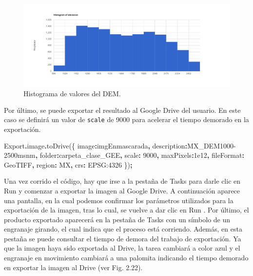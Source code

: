 \documentclass[
  12pt,
  letterpaper,
  twoside]{book}
\newenvironment{Shaded}{\begin{snugshade}}{\end{snugshade}}
\newcommand{\AttributeTok}[1]{\textcolor[rgb]{0.77,0.63,0.00}{#1}}
\newcommand{\DataTypeTok}[1]{\textcolor[rgb]{0.13,0.29,0.53}{#1}}
\newcommand{\DecValTok}[1]{\textcolor[rgb]{0.00,0.00,0.81}{#1}}
\newcommand{\FloatTok}[1]{\textcolor[rgb]{0.00,0.00,0.81}{#1}}
\newcommand{\FunctionTok}[1]{\textcolor[rgb]{0.00,0.00,0.00}{#1}}
\newcommand{\NormalTok}[1]{#1}
\newcommand{\OperatorTok}[1]{\textcolor[rgb]{0.81,0.36,0.00}{\textbf{#1}}}
\newcommand{\StringTok}[1]{\textcolor[rgb]{0.31,0.60,0.02}{#1}}
\begin{document}
\begin{figure}[btp]

{\centering \includegraphics[width=1\linewidth]{Img/histElevacion} 

}

\caption{Histograma de valores del DEM.}\label{fig:unnamed-chunk-124}
\end{figure}

Por último, se puede exportar el resultado al Google Drive del usuario. En este caso se definirá un valor de \texttt{scale} de 9000 para acelerar el tiempo demorado en la exportación.

\begin{Shaded}
\begin{Highlighting}[]
\NormalTok{Export}\OperatorTok{.}\AttributeTok{image}\OperatorTok{.}\FunctionTok{toDrive}\NormalTok{(\{}
  \DataTypeTok{image}\OperatorTok{:}\NormalTok{imgEnmascarada}\OperatorTok{,} 
  \DataTypeTok{description}\OperatorTok{:}\StringTok{\textquotesingle{}MX\_DEM1000{-}2500msnm\textquotesingle{}}\OperatorTok{,}
  \DataTypeTok{folder}\OperatorTok{:}\StringTok{\textquotesingle{}carpeta\_clase\_GEE\textquotesingle{}}\OperatorTok{,}
  \DataTypeTok{scale}\OperatorTok{:} \DecValTok{9000}\OperatorTok{,}
  \DataTypeTok{maxPixels}\OperatorTok{:}\FloatTok{1e12}\OperatorTok{,}
  \DataTypeTok{fileFormat}\OperatorTok{:} \StringTok{\textquotesingle{}GeoTIFF\textquotesingle{}}\OperatorTok{,}
  \DataTypeTok{region}\OperatorTok{:}\NormalTok{ MX}\OperatorTok{,}
  \DataTypeTok{crs}\OperatorTok{:} \StringTok{\textquotesingle{}EPSG:4326\textquotesingle{}}
\NormalTok{\})}\OperatorTok{;}
\end{Highlighting}
\end{Shaded}

Una vez corrido el código, hay que irse a la pestaña de Tasks para darle clic en Run y comenzar a exportar la imagen al Google Drive. A continuación aparece una pantalla, en la cual podemos confirmar los parámetros utilizados para la exportación de la imagen, tras lo cual, se vuelve a dar clic en Run . Por último, el producto exportado aparecerá en la pestaña de Tasks con un símbolo de un engranaje girando, el cual indica que el proceso está corriendo. Además, en esta pestaña se puede consultar el tiempo de demora del trabajo de exportación. Ya que la imagen haya sido exportada al Drive, la tarea cambiará a color azul y el engranaje en movimiento cambiará a una palomita indicando el tiempo demorado en exportar la imagen al Drive (ver Fig. 2.22).
\end{document}
